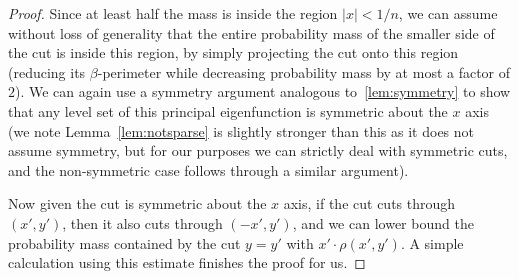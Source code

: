 \begin{proof}
  Since at least half the mass is inside the
  region $|x| < 1/n$, we can assume without loss of generality that the
  entire probability mass of the smaller side of the cut is inside this region, by simply projecting
  the cut onto this region (reducing its $\beta$-perimeter while
  decreasing probability mass by at most a factor of $2$). We can again
  use a symmetry argument analogous to~\ref{lem:symmetry} to show that
  any level set of this principal eigenfunction is symmetric about the
  $x$ axis (we note Lemma~\ref{lem:notsparse} is slightly stronger than
  this as it does not assume symmetry, but for our purposes we can
  strictly deal with symmetric cuts, and the non-symmetric case follows
  through a similar argument). 

  Now given the cut is symmetric about the $x$ axis, if the cut cuts
  through $(x',y')$, then it also cuts through $(-x',y')$, and we can lower
  bound the probability mass contained by the cut $y = y'$ with $x'
  \cdot \rho(x',y')$. A simple calculation using this estimate finishes
  the proof for us.


\end{proof}




